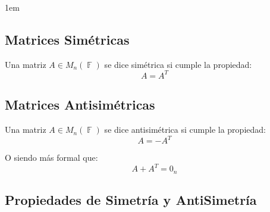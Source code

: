 \documentclass[12pt, fleqn]{report}                             %
\newenvironment{SmallIndentation}[1][0.75em]                    %
        {\begin{adjustwidth}{#1}{}\begin{footnotesize}}             %
        {\end{footnotesize}\end{adjustwidth}}                       %
\theoremstyle{break}                                            %
\DeclareMathOperator \GenericField {\mathbb{F}}                 %
\begin{document}
\begin{itemize}
\begin{SmallIndentation}[1em]
                        \end{SmallIndentation}
                            
                                    



                \end{itemize}



                        
            \clearpage
            \subsection{Matrices Simétricas}

                Una matriz $A \in M_n(\GenericField)$ se dice simétrica si cumple la propiedad:
                \begin{equation*}
                    A = A^T
                \end{equation*}



            \vspace{1em}
            \subsection{Matrices Antisimétricas}

                Una matriz $A \in M_n(\GenericField)$ se dice antisimétrica si cumple la propiedad:
                \begin{equation*}
                    A = -A^T
                \end{equation*}

                O siendo más formal que:
                \begin{equation*}
                    A + A^T = 0_n
                \end{equation*}



                \clearpage
                \subsection{Propiedades de Simetría y AntiSimetría}
\end{document}
